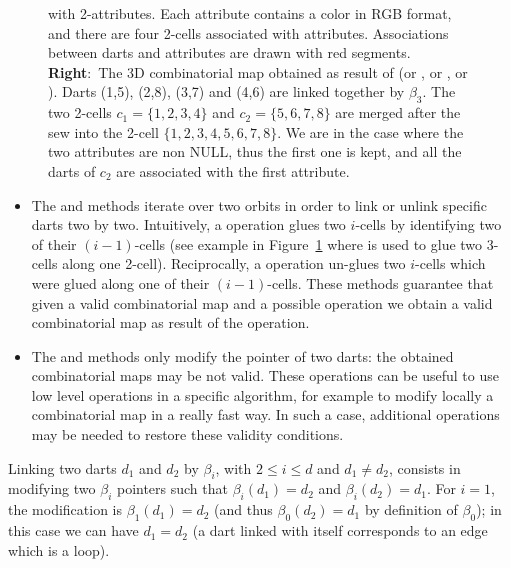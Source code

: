 \begin{figure}
{    with 2-attributes. Each attribute contains a color in RGB format,
    and there are four 2-cells associated with attributes.
    Associations between darts and attributes are drawn with red
    segments. \textbf{Right}:~The 3D combinatorial map obtained as
    result of  (or , or
    , or ). Darts (1,5), (2,8),
    (3,7) and (4,6) are linked together by $\beta_3$. The two 2-cells
    $c_1=\{1,2,3,4\}$ and $c_2=\{5,6,7,8\}$ are merged after the sew
    into the 2-cell $\{1,2,3,4,5,6,7,8\}$. We are in the case where
    the two attributes are non NULL, thus the first one is kept, and
    all the darts of $c_2$ are associated with the first attribute.}
  \label{fig-exemple-sew}
\end{figure}
\begin{itemize}
\item The  and  methods iterate over two orbits in
  order to link or unlink specific darts two by two.  Intuitively, a
   operation glues two $i$-cells by identifying two of
  their $(i-1)$-cells (see example in Figure~\ref{fig-exemple-sew}
  where  is used to glue two 3-cells along one 2-cell).
  Reciprocally, a  operation un-glues two $i$-cells which
  were glued along one of their $(i-1)$-cells.
  These methods guarantee that given a valid combinatorial map and a
  possible operation we obtain a valid combinatorial map as result of
  the operation.

\item
\begin{ccAdvanced}
The  and  methods only modify
  the pointer of two darts: the obtained combinatorial maps may be not
  valid. These operations can be useful to use low level operations
  in a specific algorithm, for example to modify locally a
  combinatorial map in a really fast way. In such a case, additional
  operations may be needed to restore these validity conditions.
\end{ccAdvanced}
\end{itemize}

Linking two darts $d_1$ and $d_2$ by $\beta_i$, with $2\leq i\leq d$
and $d_1 \neq d_2$, consists in modifying two $\beta_i$ pointers such that
$\beta_i(d_1)=d_2$ and $\beta_i(d_2)=d_1$. For $i=1$, the modification
is $\beta_1(d_1)=d_2$ (and thus $\beta_0(d_2)=d_1$ by definition of
$\beta_0$); in this case we can have $d_1=d_2$ (a dart linked with
itself corresponds to an edge which is a loop).

